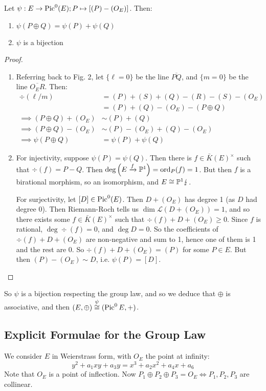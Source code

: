 \documentclass[10pt,a4paper]{article}
\begin{document}
\begin{proposition}
  Let $\psi : E \to \operatorname{Pic}^0(E); P \mapsto [(P) - (O_E)]$. Then:
  \begin{enumerate}
    \item $\psi(P \oplus Q) = \psi(P) + \psi(Q)$
    \item $\psi$ is a bijection
  \end{enumerate}
\end{proposition}
\begin{proof}\hspace*{0cm}
  \begin{enumerate}[label=\textit{\arabic*.}]
    \item Referring back to Fig. 2, let $\{\ell=0\}$ be the line {\color{blue}$\overline{PQ}$}, and $\{m=0\}$ be the line {\color{burgundy}$\overline{O_E R}$}. Then:
    \begin{align*}
      \div(\ell/m) &= (P)+(S)+(Q)-(R)-(S)-(O_E)\\
      &= (P)+(Q)-(O_E)-(P\oplus Q)\\
      \implies (P\oplus Q)+(O_E) &\sim (P)+(Q)\\
      \implies (P\oplus Q)-(O_E) &\sim (P)-(O_E)+(Q)-(O_E)\\
      \implies \psi(P\oplus Q) &= \psi(P) + \psi(Q)
    \end{align*}
    \item For injectivity, suppose $\psi(P) = \psi(Q)$. Then there is $f \in \bar{K}(E)^\times$ such that $\div(f) = P-Q$. Then $\deg\left(E\xrightarrow{f}\mathbb{P}^1\right) = \operatorname{ord}_P(f) = 1$. But then $f$ is a birational morphism, so an isomorphism, and $E \cong \mathbb{P}^1 \lightning$.

    For surjectivity, let $[D] \in \operatorname{Pic}^0(E)$. Then $D+(O_E)$ has degree 1 (as $D$ had degree $0$). Then Riemann-Roch tells us $\dim \mathscr{L}(D+(O_E)) = 1$, and so there exists some $f \in \bar{K}(E)^\times$ such that $\div(f)+D+(O_E) \geq 0$. Since $f$ is rational, $\deg \div(f) = 0$, and $\deg D = 0$. So the coefficients of $\div(f) + D + (O_E)$ are non-negative and sum to 1, hence one of them is 1 and the rest are 0. So $\div(f) + D + (O_E) = (P)$ for some $P \in E$. But then $(P) - (O_E) \sim D$, i.e. $\psi(P) = [D]$.
  \end{enumerate}
\end{proof}
So $\psi$ is a bijection respecting the group law, and so we deduce that $\oplus$ is associative, and then $(E, \oplus) \overset{\psi}{\cong} (\operatorname{Pic}^0E, +)$.

\subsection{Explicit Formulae for the Group Law}
We consider $E$ in Weierstrass form, with $O_E$ the point at infinity:
\[y^2 + a_1 xy + a_3 y = x^3 + a_2 x^2 + a_4 x + a_6\tag{$\ast$}\]
Note that $O_E$ is a point of inflection. Now $P_1 \oplus P_2 \oplus P_3 = O_E \iff P_1, P_2, P_3$ are collinear.
\end{document}

